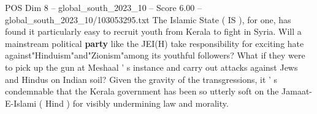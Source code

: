 \begin{textsample}{POS Dim 8 – global\_south\_2023\_10 – Score 6.00 – global\_south\_2023\_10/103053295.txt}
The Islamic State ( IS ), for one, has found it particularly easy to recruit youth from Kerala to fight in Syria.
Will a mainstream political \textbf{party} like the JEI(H) take responsibility for exciting hate against"Hinduism"and"Zionism"among its youthful followers?
What if they were to pick up the gun at Meshaal ' s instance and carry out attacks against Jews and Hindus on Indian soil?
Given the gravity of the transgressions, it ' s condemnable that the Kerala government has been so utterly soft on the Jamaat-E-Islami ( Hind ) for visibly undermining law and morality.

\end{textsample}
